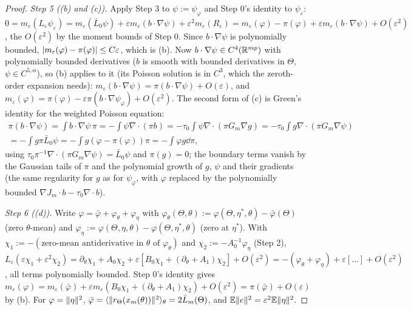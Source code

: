 \begin{proof}
\smallskip
\emph{Step 5 ((b) and (c)).} Apply Step 3 to $\psi := \psi_\varphi$ and Step 0's identity to $\psi_\varepsilon$:
$0 = m_\varepsilon(L_\varepsilon\psi_\varepsilon) = m_\varepsilon(\bar L_0\psi) + \varepsilon m_\varepsilon(b\cdot\nabla\psi)
+ \varepsilon^2m_\varepsilon(R_\varepsilon) = m_\varepsilon(\varphi) - \pi(\varphi) + \varepsilon m_\varepsilon(b\cdot\nabla\psi)
+ O(\varepsilon^2)$, the $O(\varepsilon^2)$ by the moment bounds of Step 0. Since $b\cdot\nabla\psi$ is polynomially
bounded, $\lvert m_\varepsilon(\varphi) - \pi(\varphi)\rvert\le C\varepsilon$, which is (b). Now
$b\cdot\nabla\psi\in C^4(\mathbb{R}^{mp})$ with polynomially bounded derivatives ($b$ is smooth with bounded derivatives in
$\Theta$, $\psi\in C^{5,\alpha}$), so (b) applies to it (its Poisson solution is in $C^3$, which the zeroth-order
expansion needs): $m_\varepsilon(b\cdot\nabla\psi) = \pi(b\cdot\nabla\psi) + O(\varepsilon)$, and
$m_\varepsilon(\varphi) = \pi(\varphi) - \varepsilon\pi(b\cdot\nabla\psi_\varphi) + O(\varepsilon^2)$. The second
form of (c) is Green's identity for the weighted Poisson equation:
\begin{multline*}
  \pi(b\cdot\nabla\psi) = \int b\cdot\nabla\psi\,\pi = -\int\psi\nabla\cdot(\pi b)
  = -\tau_0\int\psi\nabla\cdot(\pi G_m\nabla g) = -\tau_0\int g\nabla\cdot(\pi G_m\nabla\psi)\\
  = -\int g\pi\bar L_0\psi = -\int g(\varphi - \pi(\varphi))\pi = -\int\varphi g\dd\pi,
\end{multline*}
using $\tau_0\pi^{-1}\nabla\cdot(\pi G_m\nabla\psi) = \bar L_0\psi$ and $\pi(g) = 0$; the boundary terms vanish by the
Gaussian tails of $\pi$ and the polynomial growth of $g$, $\psi$ and their gradients (the same regularity for $g$ as
for $\psi_\varphi$, with $\varphi$ replaced by the polynomially bounded $\nabla J_m\cdot b - \tau_0\nabla\cdot b$).

\smallskip
\emph{Step 6 ((d)).} Write $\varphi = \bar\varphi + \varphi_\theta + \varphi_\eta$ with
$\varphi_\theta(\Theta,\theta) := \varphi(\Theta,\eta^*,\theta) - \bar\varphi(\Theta)$ (zero $\theta$-mean) and
$\varphi_\eta := \varphi(\Theta,\eta,\theta) - \varphi(\Theta,\eta^*,\theta)$ (zero at $\eta^*$). With
$\chi_1 := -(\text{zero-mean antiderivative in $\theta$ of }\varphi_\theta)$ and $\chi_2 := -A_0^{-1}\varphi_\eta$
(Step 2), $L_\varepsilon(\varepsilon\chi_1 + \varepsilon^2\chi_2) = \partial_\theta\chi_1 + A_0\chi_2
+ \varepsilon[B_0\chi_1 + (\partial_\theta + A_1)\chi_2] + O(\varepsilon^2)
= -(\varphi_\theta + \varphi_\eta) + \varepsilon[\dots] + O(\varepsilon^2)$, all terms polynomially bounded. Step 0's
identity gives $m_\varepsilon(\varphi) = m_\varepsilon(\bar\varphi)
+ \varepsilon m_\varepsilon(B_0\chi_1 + (\partial_\theta + A_1)\chi_2) + O(\varepsilon^2) = \pi(\bar\varphi) + O(\varepsilon)$
by (b). For $\varphi = \lVert \eta\rVert^2$, $\bar\varphi = \langle\lVert r_\Theta(x_m(\theta))\rVert^2\rangle_\theta
= 2\bar L_m(\Theta)$, and $\mathbb{E}\lVert e\rVert^2 = \varepsilon^2\mathbb{E}\lVert \eta\rVert^2$.


\end{proof}
